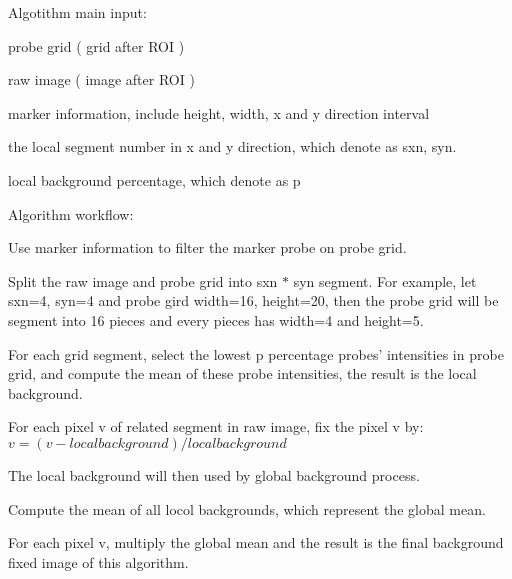 Algotithm main input\-:


\begin{DoxyItemize}
\item probe grid ( grid after R\-O\-I )
\item raw image ( image after R\-O\-I )
\item marker information, include height, width, x and y direction interval
\item the local segment number in x and y direction, which denote as sxn, syn.
\item local background percentage, which denote as p
\end{DoxyItemize}

Algorithm workflow\-:


\begin{DoxyEnumerate}
\item Use marker information to filter the marker probe on probe grid.
\item Split the raw image and probe grid into sxn $\ast$ syn segment. For example, let sxn=4, syn=4 and probe gird width=16, height=20, then the probe grid will be segment into 16 pieces and every pieces has width=4 and height=5.
\item For each grid segment, select the lowest p percentage probes' intensities in probe grid, and compute the mean of these probe intensities, the result is the local background.
\item For each pixel v of related segment in raw image, fix the pixel v by\-: $ v = (v - local background) / local background $
\item The local background will then used by global background process.
\begin{DoxyEnumerate}
\item Compute the mean of all locol backgrounds, which represent the global mean.
\item For each pixel v, multiply the global mean and the result is the final background fixed image of this algorithm. 
\end{DoxyEnumerate}
\end{DoxyEnumerate}